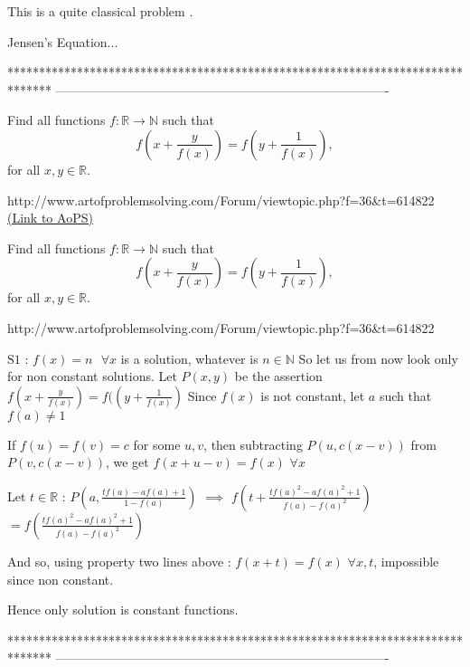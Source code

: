 \begin{solution}
	\begin{tcolorbox}

This is a quite classical problem .\end{tcolorbox}

Jensen's Equation...
\end{solution}
*******************************************************************************
-------------------------------------------------------------------------------

\begin{problem}
	Find all functions $f:\mathbb{R} \rightarrow \mathbb{N}$ such that \[f\left(x + \frac{y}{ f(x)}\right) = f\left(y + \frac{1}{f(x)}\right),\] for all $x,y \in \mathbb{R}.$


http://www.artofproblemsolving.com/Forum/viewtopic.php?f=36&t=614822
	\flushright \href{https://artofproblemsolving.com/community/c6h616143}{(Link to AoPS)}
\end{problem}



\begin{solution}
	\begin{tcolorbox}Find all functions $f:\mathbb{R} \rightarrow \mathbb{N}$ such that \[f\left(x + \frac{y}{ f(x)}\right) = f\left(y + \frac{1}{f(x)}\right),\] for all $x,y \in \mathbb{R}.$


http://www.artofproblemsolving.com/Forum/viewtopic.php?f=36&t=614822\end{tcolorbox}
$\boxed{\text{S1 : }f(x)=n\text{  }\forall x}$ is a solution, whatever is $n\in\mathbb N$ So let us from now look only for non constant solutions.
Let $P(x,y)$ be the assertion $f\left(x+\frac y{f(x)}\right)=f(\left(y+\frac 1{f(x)}\right)$
Since $f(x)$ is not constant, let $a$ such that $f(a)\ne 1$

If $f(u)=f(v)=c$ for some $u,v$, then subtracting $P(u,c(x-v))$ from $P(v,c(x-v))$, we get $f(x+u-v)=f(x)$ $\forall x$

Let $t\in\mathbb R$ : $P(a,\frac{tf(a)-af(a)+1}{1-f(a)})$ $\implies$ $f(t+\frac{tf(a)^2-af(a)^2+1}{f(a)-f(a)^2})$ $=f(\frac{tf(a)^2-af(a)^2+1}{f(a)-f(a)^2})$

And so, using property two lines above : $f(x+t)=f(x)$ $\forall x,t$, impossible since non constant.

Hence only solution is constant functions.
\end{solution}
*******************************************************************************
-------------------------------------------------------------------------------

